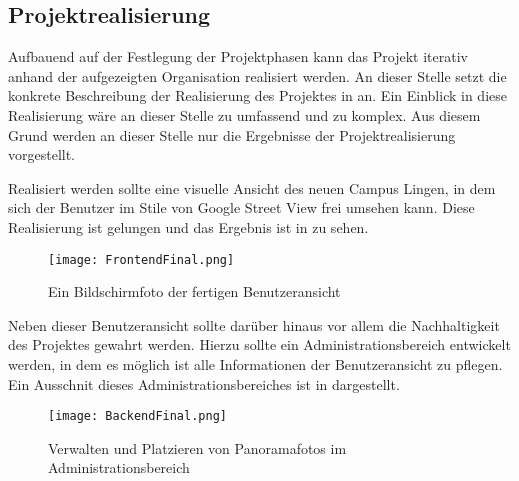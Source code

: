 \subsection{Projektrealisierung}
\label{sec:Projektrealisierung}

Aufbauend auf der Festlegung der Projektphasen kann das Projekt iterativ anhand der aufgezeigten Organisation
realisiert werden. An dieser Stelle setzt die konkrete Beschreibung der Realisierung des
Projektes in \citet{modelierungUndBetrieb2014} an.
Ein Einblick in diese Realisierung wäre an dieser Stelle zu umfassend und zu komplex. Aus diesem Grund werden an dieser
Stelle nur die Ergebnisse der Projektrealisierung vorgestellt.

Realisiert werden sollte eine visuelle Ansicht des neuen Campus Lingen, in dem sich der Benutzer im Stile von Google
Street View frei umsehen kann. Diese Realisierung ist gelungen und das Ergebnis ist in 
zu sehen.

\clearpage
\begin{figure}[htb] 
\centering
\texttt{[image: FrontendFinal.png]}
\caption[Abbildung der Benutzeransicht]{Ein Bildschirmfoto der fertigen Benutzeransicht\protect}
\label{fig:FrontendFinal}
\end{figure}

Neben dieser Benutzeransicht sollte darüber hinaus vor allem die Nachhaltigkeit des Projektes gewahrt werden.
Hierzu sollte ein Administrationsbereich entwickelt werden, in dem es möglich ist alle Informationen
der Benutzeransicht zu pflegen. Ein Ausschnit dieses Administrationsbereiches ist 
in  dargestellt.

\begin{figure}[htb] 
\centering
\texttt{[image: BackendFinal.png]}
\caption[Ausschnitt des Administrationsbereiches]{Verwalten und Platzieren von Panoramafotos im Administrationsbereich\protect}
\label{fig:BackendFinal}
\end{figure}
\clearpage